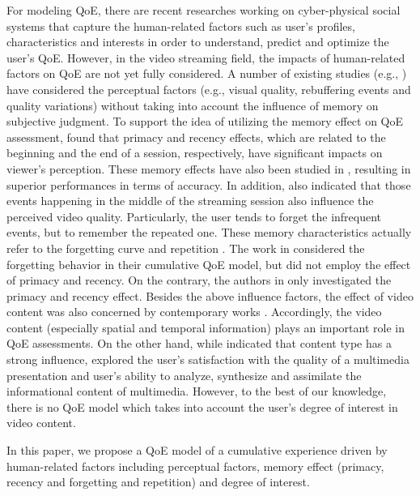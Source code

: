 For modeling QoE, there are recent researches working on cyber-physical social systems \cite{QoEModel_Museum1, QoEModel_Museum2}
that capture the human-related factors such as user's profiles, characteristics and interests in order to understand, predict and optimize the user's QoE. However, in the video streaming field, the impacts of human-related factors on QoE are not yet fully considered. A number of existing studies (e.g., \cite{QoEModel_OP_EstimatingQoE, QoEModel_OP_DerivingValidatingUserExperience, QoEModel_OP_VideoQualityMetric, QoEModel_IP_TimeVaryingSubjectiveQuality, QoeModel_IP_ShortLongTermQualityModel}) have considered the perceptual factors (e.g., visual quality, rebuffering events and quality variations) without taking into account the influence of memory on subjective judgment.
To support the idea of utilizing the memory effect on QoE assessment, \cite{NetflixQoE, StallingEvents, LFOVIA} found that primacy and recency effects, which are related to the beginning and the end of a session, respectively, have significant impacts on viewer's perception. These memory effects have also been studied in \cite{QoEModel_OM_BitrateDistribution, QoEModel_OM_DistortionsRebuffMemory, QoEModel_IM_NARX_DynamicNetworks, LFOVIA, QoEModel_IM_TVQoE_ContinuousTimeQoE, QoEModel_IM_NLSS, QoEModel_IM_LSTM_QoE}, resulting in superior performances in terms of accuracy.
In addition, \cite{NetflixQoE,StallingEvents} also indicated that those events happening in the middle of the streaming session also influence the perceived video quality.
Particularly, the user tends to forget the infrequent events, but to remember the repeated one. These memory characteristics actually refer to the forgetting curve \cite{UserForgetful,Ebbinghaus_ForgettingCurve} and repetition \cite{Ebbinghaus_ForgettingCurve}. The work in \cite{CumulativeQoE_Assessing} considered the forgetting behavior in their cumulative QoE model, but did not employ the effect of primacy and recency. On the contrary, the authors in \cite{CumulativeQuaityModel} only investigated the primacy and recency effect. Besides the above influence factors, the effect of video content was also concerned by contemporary works \cite{QoSImpactUserVideoClips,SubjectiveQualityPairedComparison,QoEEvaluation_IPTV_Services,QoEModel_OM_BitrateDistribution,QoeModel_CI_ExpectationConfirmationTheory,QoEModel_IM_TVQoE_ContinuousTimeQoE}. Accordingly, the video content (especially spatial and temporal information) plays an important role in QoE assessments. On the other hand, while \cite{QoEEvaluation_IPTV_Services} indicated that content type has a strong influence, \cite{EyeTracking} explored the user's satisfaction with the quality of a multimedia presentation and user's ability to analyze, synthesize and assimilate the informational content of multimedia. However, to the best of our knowledge, there is no QoE model which takes into account the user's degree of interest in video content. 

In this paper, we propose a QoE model of a cumulative experience driven by human-related factors including perceptual factors, memory effect (primacy, recency and forgetting and repetition) and degree of interest. 